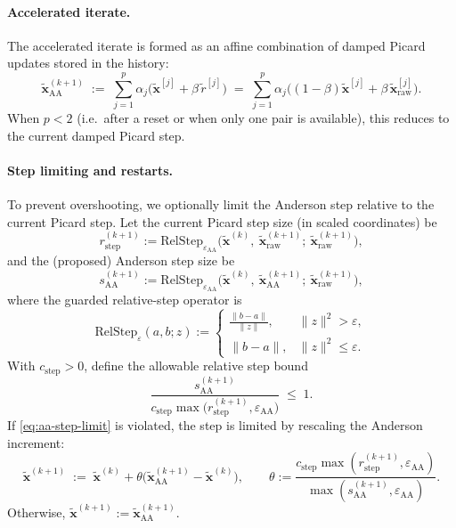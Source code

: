 \paragraph{Accelerated iterate.}
The accelerated iterate is formed as an affine combination of damped Picard updates stored in the history:
\begin{equation}\label{eq:aa-update}
\widetilde{\mathbf{x}}_{\mathrm{AA}}^{(k+1)} \;:=\;
\sum_{j=1}^p \alpha_j\Big(\widetilde{\mathbf{x}}^{[j]} + \beta\,\widetilde{r}^{[j]}\Big)
\;=\;
\sum_{j=1}^p \alpha_j\Big((1-\beta)\widetilde{\mathbf{x}}^{[j]} + \beta\,\widetilde{\mathbf{x}}_{\mathrm{raw}}^{[j]}\Big).
\end{equation}
When $p<2$ (i.e.\ after a reset or when only one pair is available), this reduces to the current damped Picard step.

\paragraph{Step limiting and restarts.}
To prevent overshooting, we optionally limit the Anderson step relative to the current Picard step.
Let the current Picard step size (in scaled coordinates) be
\[
r_{\mathrm{step}}^{(k+1)} := \mathrm{RelStep}_{\varepsilon_{\mathrm{AA}}}\!\Big(\widetilde{\mathbf{x}}^{(k)},\ \widetilde{\mathbf{x}}_{\mathrm{raw}}^{(k+1)};\ \widetilde{\mathbf{x}}_{\mathrm{raw}}^{(k+1)}\Big),
\]
and the (proposed) Anderson step size be
\[
s_{\mathrm{AA}}^{(k+1)} := \mathrm{RelStep}_{\varepsilon_{\mathrm{AA}}}\!\Big(\widetilde{\mathbf{x}}^{(k)},\ \widetilde{\mathbf{x}}_{\mathrm{AA}}^{(k+1)};\ \widetilde{\mathbf{x}}_{\mathrm{raw}}^{(k+1)}\Big),
\]
where the guarded relative-step operator is
\[
\mathrm{RelStep}_{\varepsilon}(a,b;z):=
\begin{cases}
\displaystyle \frac{\|b-a\|}{\|z\|}, & \|z\|^2>\varepsilon,\\[1.0ex]
\displaystyle \|b-a\|, & \|z\|^2\le \varepsilon.
\end{cases}
\]
With $c_{\mathrm{step}}>0$, define the allowable relative step bound
\begin{equation}\label{eq:aa-step-limit}
\frac{s_{\mathrm{AA}}^{(k+1)}}{c_{\mathrm{step}}\max\!\big(r_{\mathrm{step}}^{(k+1)},\varepsilon_{\mathrm{AA}}\big)} \;\le\; 1.
\end{equation}
If \eqref{eq:aa-step-limit} is violated, the step is limited by rescaling the Anderson increment:
\[
\widetilde{\mathbf{x}}^{(k+1)} \;:=\; \widetilde{\mathbf{x}}^{(k)} +
\theta\Big(\widetilde{\mathbf{x}}_{\mathrm{AA}}^{(k+1)}-\widetilde{\mathbf{x}}^{(k)}\Big),
\qquad 
\theta := \frac{c_{\mathrm{step}}\max(r_{\mathrm{step}}^{(k+1)},\varepsilon_{\mathrm{AA}})}{\max(s_{\mathrm{AA}}^{(k+1)},\varepsilon_{\mathrm{AA}})}.
\]
Otherwise, $\widetilde{\mathbf{x}}^{(k+1)}:=\widetilde{\mathbf{x}}_{\mathrm{AA}}^{(k+1)}$.

